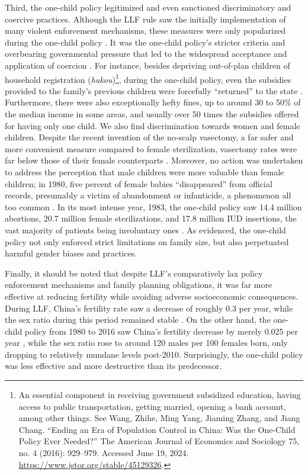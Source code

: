 \documentclass[12pt, a4paper, twoside]{article}
\begin{document}
Third, the one-child policy legitimized and even sanctioned discriminatory and coercive practices. Although the LLF rule saw the initially implementation of many violent enforcement mechanisms, these measures were only popularized during the one-child policy \autocite[pp.\ 150--151]{WhyteWangCai2015}. It was the one-child policy’s stricter criteria and overbearing governmental pressure that led to the widespread acceptance and application of coercion \autocite{LiXiaorong2015LicenseToCoerce}. For instance, besides depriving out-of-plan children of household registration (\emph{hukou})\footnote{An essential component in receiving government subsidized education, having access to public transportation, getting married, opening a bank account, among other things. See Wang, Zhihe, Ming Yang, Jiaming Zhang, and Jiang Chang. “Ending an Era of Population Control in China: Was the One-Child Policy Ever Needed?” The American Journal of Economics and Sociology 75, no. 4 (2016): 929–979. Accessed June 19, 2024. \url{https://www.jstor.org/stable/45129326}.}, during the one-child policy, even the subsidies provided to the family’s previous children were forcefully “returned” to the state \autocite[p.\ 157--158]{LiXiaorong2015LicenseToCoerce}. Furthermore, there were also exceptionally hefty fines, up to around 30 to 50\% of the median income in some areas, and usually over 50 times the subsidies offered for having only one child. We also find discrimination towards women and female children. Despite the recent invention of the no-scalp vasectomy, a far safer and more convenient measure compared to female sterilization, vasectomy rates were far below those of their female counterparts \autocite[p.\ 2]{GonzalesEtAl1992NoScalpel}. Moreover, no action was undertaken to address the perception that male children were more valuable than female children; in 1980, five percent of female babies “disappeared” from official records, presumably a victim of abandonment or infanticide, a phenomenon all too common \autocite[pp.\ 159--160]{LiXiaorong2015LicenseToCoerce}. In its most intense year, 1983, the one-child policy saw 14.4 million abortions, 20.7 million female sterilizations, and 17.8 million IUD insertions, the vast majority of patients being involuntary ones \autocite[p.\ 154]{WhyteWangCai2015}. As evidenced, the one-child policy not only enforced strict limitations on family size, but also perpetuated harmful gender biases and practices. 

Finally, it should be noted that despite LLF’s comparatively lax policy enforcement mechanisms and family planning obligations, it was far more effective at reducing fertility while avoiding adverse socioeconomic consequences. During LLF, China’s fertility rate saw a decrease of roughly 0.3 per year, while the sex ratio during this period remained stable \autocite{FangChen2018VoxEU}. On the other hand, the one-child policy from 1980 to 2016 saw China’s fertility decrease by merely 0.025 per year \autocite{HuangSilverPew2022}, while the sex ratio rose to around 120 males per 100 females born, only dropping to relatively mundane levels post-2010. Surprisingly, the one-child policy was less effective and more destructive than its predecessor.
\end{document}
